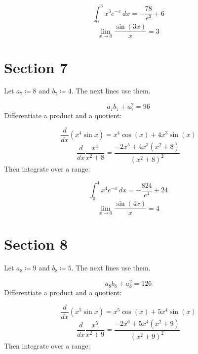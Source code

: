 \documentclass[11pt,a4paper]{article}
\theoremstyle{plain}
\theoremstyle{definition}
\theoremstyle{remark}
\begin{document}
\begin{equation*}
  \int_0^{3} x^{3} e^{-x} \, dx = -\frac{78}{e^{3}} + 6
\end{equation*}
\begin{equation*}
  \lim_{x \to 0} \frac{\sin(3 x)}{x} = 3
\end{equation*}
\section*{Section 7}

Let $a_{7} \coloneqq  8$ and $b_{7} \coloneqq  4$. The next lines use them.

\begin{equation*}
  a_{7} b_{7} + a_{7}^2 = 96
\end{equation*}
Differentiate a product and a quotient:

\begin{equation*}
  \frac{d}{dx} \left( x^{4} \sin x \right) = x^{4} \cos\left(x\right) + 4 x^{3} \sin\left(x\right)
\end{equation*}
\begin{equation*}
  \frac{d}{dx} \frac{x^{4}}{x^2 + 8} = \frac{-2 x^{5} + 4 x^{3} \left(x^{2} + 8\right)}{\left(x^{2} + 8\right)^{2}}
\end{equation*}
Then integrate over a range:

\begin{equation*}
  \int_0^{4} x^{4} e^{-x} \, dx = -\frac{824}{e^{4}} + 24
\end{equation*}
\begin{equation*}
  \lim_{x \to 0} \frac{\sin(4 x)}{x} = 4
\end{equation*}
\section*{Section 8}

Let $a_{8} \coloneqq  9$ and $b_{8} \coloneqq  5$. The next lines use them.

\begin{equation*}
  a_{8} b_{8} + a_{8}^2 = 126
\end{equation*}
Differentiate a product and a quotient:

\begin{equation*}
  \frac{d}{dx} \left( x^{5} \sin x \right) = x^{5} \cos\left(x\right) + 5 x^{4} \sin\left(x\right)
\end{equation*}
\begin{equation*}
  \frac{d}{dx} \frac{x^{5}}{x^2 + 9} = \frac{-2 x^{6} + 5 x^{4} \left(x^{2} + 9\right)}{\left(x^{2} + 9\right)^{2}}
\end{equation*}
Then integrate over a range:
\end{document}
